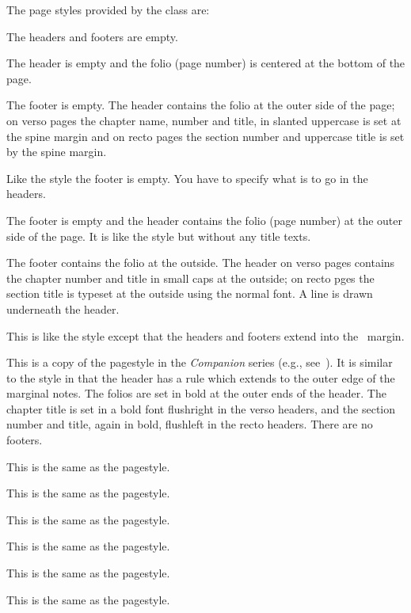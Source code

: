     The page styles provided by the class are:
\begin{plainlist}
\item[\pstyle{empty}] The headers and footers are empty.
\item[\pstyle{plain}] The header is empty and the folio (page number)
     is centered at the bottom of the page.
\item[\pstyle{headings}] The footer is empty. The header contains 
     the folio at the outer side of the page; on verso
     pages the chapter name, number and title, in slanted uppercase is
     set at the spine margin and on recto pages the section number
     and uppercase title is set by the spine margin.
\item[\pstyle{myheadings}] Like the  style the footer
     is empty. You have to specify what is to go in the headers.
\item[\pstyle{simple}] The footer is empty and the 
     header contains the folio (page number)
     at the outer side of the page. It is like the 
     style but without any title texts.
\item[\pstyle{ruled}] The footer contains the 
     folio at the outside. The header
     on verso pages contains the chapter number and title in small caps
     at the outside; on recto pges the section title is typeset at the
     outside using the normal font. A line is drawn
     underneath the header.
\item[\pstyle{Ruled}] This is like the  style except that 
     the headers and footers extend into 
     the \foredge\ margin.
\item[\pstyle{companion}] This is a copy of the pagestyle in the 
     \textit{Companion} series (e.g., see~\cite{COMPANION}). It is
     similar to the  style in that the header has a rule which
     extends to the outer edge of the marginal notes. The folios are set 
     in bold at the outer ends of the header. The chapter title is set in
     a bold font flushright in the verso headers, and the section number 
     and title, again in bold, flushleft in the recto headers. 
     There are no footers.
\item[\pstyle{book}] This is the same as the  pagestyle.
\item[\pstyle{chapter}]  This is the same as the  pagestyle.
\item[\pstyle{cleared}]  This is the same as the  pagestyle.
\item[\pstyle{part}] This is the same as the  pagestyle.
\item[\pstyle{title}]   This is the same as the  pagestyle.
\item[\pstyle{titlingpage}] This is the same as the  pagestyle.
\end{plainlist}

